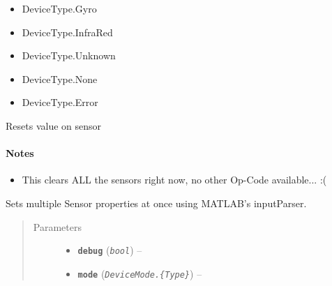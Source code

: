 \documentclass[letterpaper,10pt,english]{sphinxmanual}
\begin{document}
\begin{fulllineitems}
\begin{fulllineitems}
\begin{itemize}
\item {} 
DeviceType.Gyro

\item {} 
DeviceType.InfraRed

\item {} 
DeviceType.Unknown

\item {} 
DeviceType.None

\item {} 
DeviceType.Error

\end{itemize}

\end{fulllineitems}


\begin{fulllineitems}
\label{source:source.Sensor.reset}
Resets value on sensor
\paragraph{Notes}
\begin{itemize}
\item {} 
This clears ALL the sensors right now, no other Op-Code available... :(

\end{itemize}

\end{fulllineitems}


\begin{fulllineitems}
\label{source:source.Sensor.setProperties}
Sets multiple Sensor properties at once using MATLAB's inputParser.
\begin{quote}\begin{description}
\item[{Parameters}] \leavevmode\begin{itemize}
\item {} 
\textbf{\texttt{debug}} (\emph{\texttt{bool}}) -- 

\item {} 
\textbf{\texttt{mode}} (\emph{\texttt{DeviceMode.\{Type\}}}) -- 

\end{itemize}


\end{description}
\end{quote}
\end{fulllineitems}
\end{fulllineitems}
\end{document}
